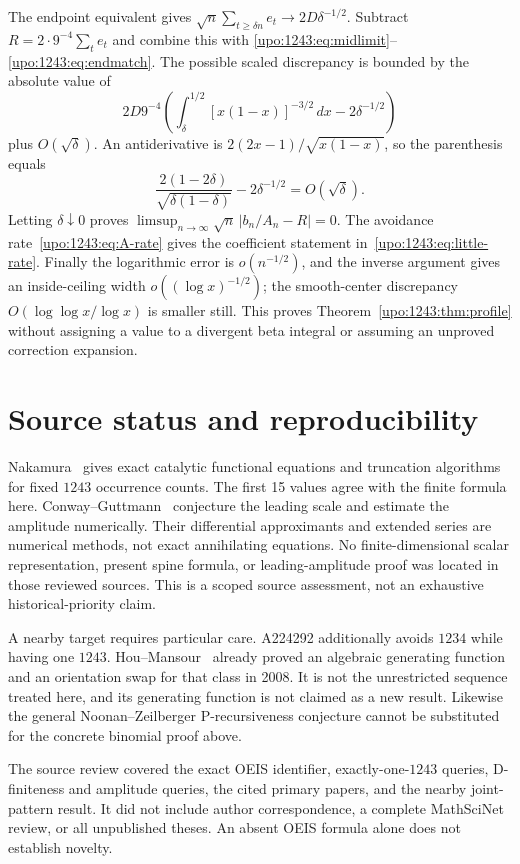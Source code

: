 \documentclass[11pt,letterpaper]{article}
\theoremstyle{remark}\newtheorem{remark}[theorem]{Remark}
\numberwithin{equation}{section}
\begin{document}
The endpoint equivalent gives
$\sqrt n\sum_{t\ge\delta n}e_t\to2D\delta^{-1/2}$.
Subtract $R=2\cdot9^{-4}\sum_t e_t$ and combine this with
\eqref{upo:1243:eq:midlimit}--\eqref{upo:1243:eq:endmatch}. The possible scaled discrepancy
is bounded by the absolute value of
\[
 2D9^{-4}\left(
 \int_\delta^{1/2}[x(1-x)]^{-3/2}\,dx-2\delta^{-1/2}
 \right)
\]
plus $O(\sqrt\delta)$.
An antiderivative is $2(2x-1)/\sqrt{x(1-x)}$, so the parenthesis equals
\[
 \frac{2(1-2\delta)}{\sqrt{\delta(1-\delta)}}
       -2\delta^{-1/2}=O(\sqrt\delta).
\]
Letting $\delta\downarrow0$ proves
$\limsup_{n\to\infty}\sqrt n\,|b_n/A_n-R|=0$.
The avoidance rate~\eqref{upo:1243:eq:A-rate} gives the coefficient statement
in~\eqref{upo:1243:eq:little-rate}. Finally the logarithmic error is
$o(n^{-1/2})$, and the inverse argument gives an inside-ceiling width
$o((\log x)^{-1/2})$; the smooth-center discrepancy
$O(\log\log x/\log x)$ is smaller still.
This proves Theorem~\ref{upo:1243:thm:profile} without assigning a value to a
divergent beta integral or assuming an unproved correction expansion.

\section{Source status and reproducibility}\label{upo:1243:sec:scope}
Nakamura~\cite[Section 2.2, Theorem 2]{Nakamura} gives exact catalytic
functional equations and truncation algorithms for fixed $1243$
occurrence counts. The first 15 values agree with the finite formula
here. Conway--Guttmann~\cite[Section 5.2]{CG} conjecture the leading scale
and estimate the amplitude numerically. Their differential approximants
and extended series are numerical methods, not exact annihilating
equations. No finite-dimensional scalar representation, present spine
formula, or leading-amplitude proof was located in those reviewed
sources. This is a scoped source assessment, not an exhaustive
historical-priority claim.

A nearby target requires particular care. A224292 additionally avoids
$1234$ while having one $1243$. Hou--Mansour~\cite[Example 6 and Theorem 7]{HM}
already proved an algebraic generating function and an orientation swap
for that class in 2008. It is not the unrestricted sequence treated
here, and its generating function is not claimed as a new result.
Likewise the general Noonan--Zeilberger P-recursiveness conjecture cannot
be substituted for the concrete binomial proof above.

The source review covered the exact OEIS identifier, exactly-one-$1243$
queries, D-finiteness and amplitude queries, the cited primary papers,
and the nearby joint-pattern result. It did not include author
correspondence, a complete MathSciNet review, or all unpublished theses.
An absent OEIS formula alone does not establish novelty.
\end{document}

